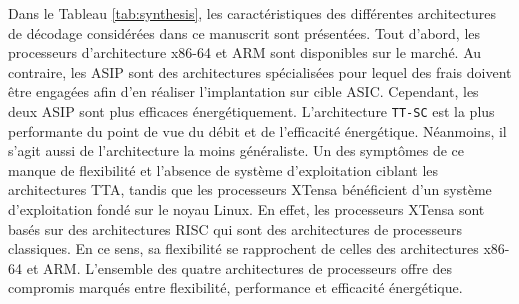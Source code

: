Dans le Tableau \ref{tab:synthesis}, les caractéristiques des différentes architectures de décodage considérées dans ce manuscrit sont présentées. Tout d'abord, les processeurs d'architecture x86-64 et ARM sont disponibles sur le marché. Au contraire, les ASIP sont des architectures spécialisées pour lequel des frais doivent être engagées afin d'en réaliser l'implantation sur cible ASIC. Cependant, les deux ASIP sont plus efficaces énergétiquement. L'architecture \texttt{TT-SC} est la plus performante du point de vue du débit et de l'efficacité énergétique. Néanmoins, il s'agit aussi de l'architecture la moins généraliste. Un des symptômes de ce manque de flexibilité et l'absence de système d'exploitation ciblant les architectures TTA, tandis que les processeurs XTensa bénéficient d'un système d'exploitation fondé sur le noyau Linux. En effet, les processeurs XTensa sont basés sur des architectures RISC qui sont des architectures de processeurs classiques. En ce sens, sa flexibilité se rapprochent de celles des architectures x86-64 et ARM.
L'ensemble des quatre architectures de processeurs offre des compromis marqués entre flexibilité, performance et efficacité énergétique.
  \begin{table}[htp]
    \centering
    \caption{Existence, disponibilité d'un système d'exploitation, débits et consommation énergétiques des processeurs pour les différentes architectures considérées. Les intervalles de débit et de consommation énergétique concernent le décodage de mots de codes polaires dont les tailles varient de $N=128$ à $N=1024$ et dont le rendement est $R=1/2$}
    \label{tab:synthesis}
    {\small{}}
  \end{table}


